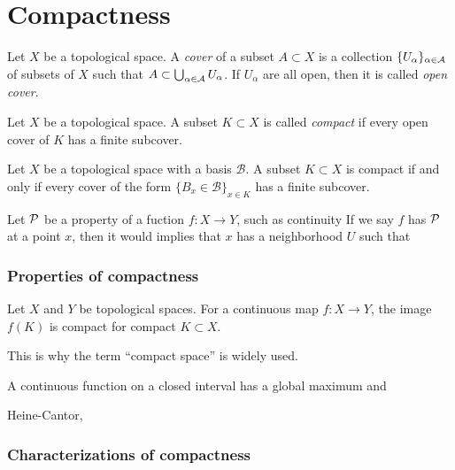 \documentclass{../crs}
\begin{document}
\chapter{Compactness}


\begin{defn}
Let $X$ be a topological space.
A \emph{cover} of a subset $A\subset X$ is a collection $\{U_\alpha\}_{\alpha\in\mathcal{A}}$ of subsets of $X$ such that $A\subset\bigcup_{\alpha\in\mathcal{A}}U_\alpha$.
If $U_\alpha$ are all open, then it is called \emph{open cover}.
\end{defn}
\begin{defn}
Let $X$ be a topological space.
A subset $K\subset X$ is called \emph{compact} if every open cover of $K$ has a finite subcover.
\end{defn}
\begin{prop}
Let $X$ be a topological space with a basis $\mathcal{B}$.
A subset $K\subset X$ is compact if and only if every cover of the form $\{B_x\in\mathcal{B}\}_{x\in K}$ has a finite subcover.
\end{prop}
\begin{rmk}
Let $\mathcal{P}$ be a property of a fuction $f\colon X\to Y$, such as continuity
If we say $f$ has $\mathcal{P}$ at a point $x$, then it would implies that $x$ has a neighborhood $U$ such that 
\end{rmk}

\subsection{Properties of compactness}
\begin{thm}
Let $X$ and $Y$ be topological spaces.
For a continuous map $f\colon X\to Y$, the image $f(K)$ is compact for compact $K\subset X$.
\end{thm}

\begin{rmk}
This is why the term ``compact space'' is widely used.
\end{rmk}

\begin{cor}
A continuous function on a closed interval has a global maximum and
\end{cor}

Heine-Cantor,



\subsection{Characterizations of compactness}
\end{document}
